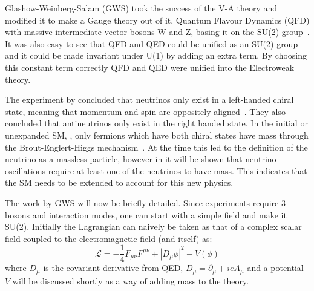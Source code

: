 
Glashow-Weinberg-Salam (GWS) took the success of the V-A theory and modified it to make a Gauge theory out of it, Quantum Flavour Dynamics (QFD) with massive intermediate vector bosons W and Z, basing it on the SU(2) group~\cite{92Weinberg, 93Salam, 94Glashow}. It was also easy to see that QFD and QED could be unified as an SU(2) group and it could be made invariant under U(1) by adding an extra term. By choosing this constant term correctly QFD and QED were unified into the Electroweak theory.

The experiment by \citeauthor{1Helicity} concluded that neutrinos only exist in a left-handed chiral state, meaning that momentum and spin are oppositely aligned~\cite{1Helicity}. They also concluded that antineutrinos only exist in the right handed state. In the initial or unexpanded SM, \cite{34doi:10.1142/9789812562203_0002}, only fermions which have both chiral states have mass through the Brout\hyp{}Englert\hyp{}Higgs mechanism~\cite{35Higgs}. At the time this led to the definition of the neutrino as a massless particle, however in  it will be shown that neutrino oscillations require at least one of the neutrinos to have mass. This indicates that the SM needs to be extended to account for this new physics.


The work by GWS will now be briefly detailed. Since experiments require 3 bosons and interaction modes, one can start with a simple field and make it SU(2). Initially the Lagrangian can naively be taken as that of a complex scalar field coupled to the electromagnetic field (and itself) as:
\begin{equation}
\mathcal{L} = - \frac{1}{4} F_{\mu\nu}F^{\mu\nu} + |D_\mu \phi |^2  -V(\phi)
\end{equation}
where $D_\mu$ is the covariant derivative from QED, $D_\mu = \partial_\mu +ieA_\mu$ and a potential $V$ will be discussed shortly as a way of adding mass to the theory.


